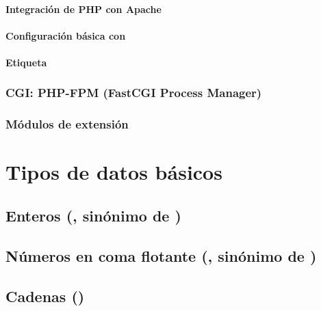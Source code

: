 \documentclass[a4paper,11pt,spanish]{sphinxmanual}
\begin{document}
\paragraph{Integración de PHP con Apache}
\label{\detokenize{contenidos:id64}}

\paragraph{Configuración básica con }
\label{\detokenize{contenidos:id65}}

\paragraph{Etiqueta }
\label{\detokenize{contenidos:id66}}

\subsubsection{CGI: PHP-FPM (FastCGI Process Manager)}
\label{\detokenize{contenidos:id67}}

\subsubsection{Módulos de extensión}
\label{\detokenize{contenidos:id68}}

\section{Tipos de datos básicos}
\label{\detokenize{contenidos:id69}}

\subsection{Enteros (, sinónimo de )}
\label{\detokenize{contenidos:id70}}

\subsection{Números en coma flotante (, sinónimo de )}
\label{\detokenize{contenidos:id71}}

\subsection{Cadenas ()}
\label{\detokenize{contenidos:id72}}
\end{document}
